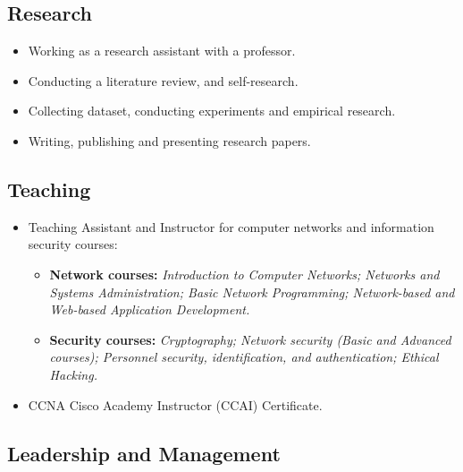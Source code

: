 \documentclass[11pt,a4paper,roman]{moderncv}        %
\begin{document}
\subsection{Research}
\begin{itemize}
	\item Working as a research assistant with a professor.
	\item Conducting a literature review, and self-research.
	\item Collecting dataset, conducting experiments and empirical research.
	\item Writing, publishing and presenting research papers.

\end{itemize}

\subsection{Teaching}
\begin{itemize}
	\item Teaching Assistant and Instructor for computer networks and information security courses:
	\begin{itemize}
		\item \textbf{Network courses:} \textit{Introduction to Computer Networks; Networks and Systems Administration; Basic Network Programming; Network-based and Web-based Application Development.}
		\item \textbf{Security courses:} \textit{Cryptography; Network security (Basic and Advanced courses); Personnel security, identification, and authentication; Ethical Hacking.}
	\end{itemize}
	\item CCNA Cisco Academy Instructor (CCAI) Certificate.	
\end{itemize}

\subsection{Leadership and Management}

\end{document}
